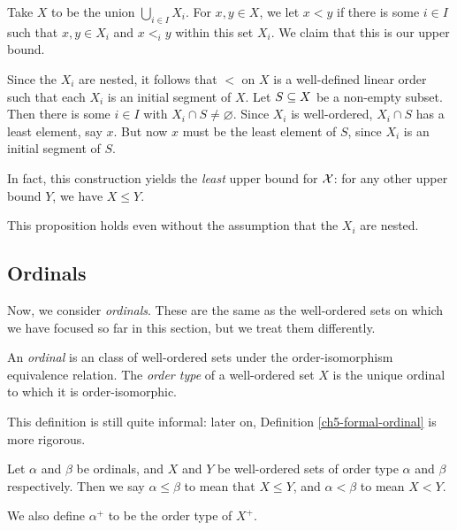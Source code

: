 \documentclass{article}
\begin{document}
\begin{prf}
    Take $X$ to be the union $\bigcup_{i \in I} X_i$. For $x, y \in X$, we let $x < y$ if there is some $i \in I$ such that $x, y \in X_i$ and $x <_i y$ within this set $X_i$. We claim that this is our upper bound.
    
    Since the $X_i$ are nested, it follows that $<$ on $X$ is a well-defined linear order such that each $X_i$ is an initial segment of $X$. Let $S \subseteq X$ be a non-empty subset. Then there is some $i \in I$ with $X_i \cap S \neq \varnothing$. Since $X_i$ is well-ordered, $X_i \cap S$ has a least element, say $x$. But now $x$ must be the least element of $S$, since $X_i$ is an initial segment of $S$.
\end{prf}

\begin{note}
	In fact, this construction yields the \textit{least} upper bound for $\mathcal{X}$: for any other upper bound $Y$, we have $X \leq Y$.
\end{note}

\begin{note}
	This proposition holds even without the assumption that the $X_i$ are nested. %
\end{note}


\subsection{Ordinals}
\label{section-ordinals-ordinals-intro}

Now, we consider \textit{ordinals}. These are the same as the well-ordered sets on which we have focused so far in this section, but we treat them differently.

\begin{definition}[Ordinal]
    An \textit{ordinal} is an class of well-ordered sets under the order-isomorphism equivalence relation. The \textit{order type} of a well-ordered set $X$ is the unique ordinal to which it is order-isomorphic.
\end{definition}

\begin{note}
	This definition is still quite informal: later on, Definition \ref{ch5-formal-ordinal} is more rigorous.
\end{note}

\begin{definition}
    Let $\alpha$ and $\beta$ be ordinals, and $X$ and $Y$ be well-ordered sets of order type $\alpha$ and $\beta$ respectively. Then we say $\alpha \leq \beta$ to mean that $X \leq Y$, and $\alpha < \beta$ to mean $X < Y$.
    
    We also define $\alpha^+$ to be the order type of $X^+$.
\end{definition}
\end{document}
